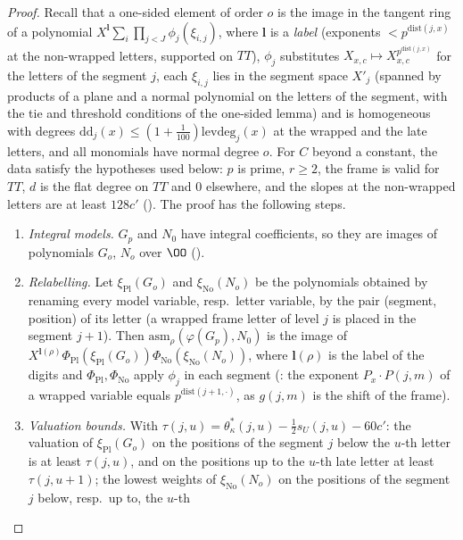 \begin{proof}
Recall that a one-sided element of order $o$ is the image in the tangent ring of a polynomial
$X^{\mathbf l}\sum_i\prod_{j<J}\phi_j(\xi_{i,j})$, where $\mathbf l$ is a \emph{label} (exponents $<p^{\mathrm{dist}(j,x)}$ at the non-wrapped letters,
supported on $TT$), $\phi_j$ substitutes $X_{x,c}\mapsto X_{x,c}^{p^{\mathrm{dist}(j,x)}}$ for the letters of the segment $j$, each $\xi_{i,j}$ lies in the
segment space $X'_j$ (spanned by products of a plane and a normal polynomial on the letters of the segment, with the tie and threshold
conditions of the one-sided lemma) and is homogeneous with degrees $\mathrm{dd}_j(x)\le(1+\frac1{100})\mathrm{levdeg}_j(x)$ at the
wrapped and the late letters, and all monomials have normal degree $o$. For $C$ beyond a constant, the data satisfy the hypotheses
used below: $p$ is prime, $r\ge2$, the frame is valid for $TT$, $d$ is the flat degree on $TT$ and $0$ elsewhere, and the slopes at the
non-wrapped letters are at least $128c'$ (). The proof has the
following steps.
\begin{enumerate}[label=(\arabic*)]
\item \emph{Integral models.} $G_p$ and $N_0$ have integral coefficients, so they are images of polynomials $G_o$, $N_o$ over $\OO$
().
\item \emph{Relabelling.} Let $\xi_{\mathrm{Pl}}(G_o)$ and $\xi_{\mathrm{No}}(N_o)$ be the polynomials obtained by renaming every model
variable, resp.\ letter variable, by the pair (segment, position) of its letter (a wrapped frame letter of level $j$ is placed in the
segment $j+1$). Then $\mathrm{asm}_\rho(\varphi(G_p),N_0)$ is the image of $X^{\mathbf l(\rho)}\Phi_{\mathrm{Pl}}(\xi_{\mathrm{Pl}}(G_o))
\Phi_{\mathrm{No}}(\xi_{\mathrm{No}}(N_o))$, where $\mathbf l(\rho)$ is the label of the digits and $\Phi_{\mathrm{Pl}},\Phi_{\mathrm{No}}$ apply
$\phi_j$ in each segment (: the exponent $P_x\cdot P(j,m)$ of a wrapped
variable equals $p^{\mathrm{dist}(j+1,\cdot)}$, as $g(j,m)$ is the shift of the frame).
\item \emph{Valuation bounds.} With $\tau(j,u)=\theta^*_\kappa(j,u)-\frac12s_U(j,u)-60c'$: the valuation of $\xi_{\mathrm{Pl}}(G_o)$ on the
positions of the segment $j$ below the $u$-th letter is at least $\tau(j,u)$, and on the positions up to the $u$-th late letter at least
$\tau(j,u+1)$; the lowest weights of $\xi_{\mathrm{No}}(N_o)$ on the positions of the segment $j$ below, resp.\ up to, the $u$-th

\end{enumerate}
\end{proof}
